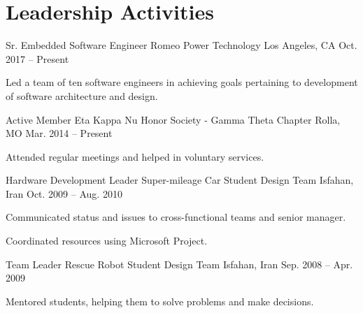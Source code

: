 \section{Leadership Activities}
\begin{cventries}
  \cventry
    {Sr. Embedded Software Engineer}
    {Romeo Power Technology}
    {Los Angeles, CA}
    {Oct. 2017 -- Present}
    {
      \begin{cvitems}
        \item Led a team of ten software engineers in achieving goals pertaining to development of software architecture and design.
      \end{cvitems}
    }
  \cventry
    {Active Member}
    {Eta Kappa Nu Honor Society - Gamma Theta Chapter}
    {Rolla, MO}
    {Mar. 2014 -- Present}
    {
      \begin{cvitems}
        \item Attended regular meetings and helped in voluntary services.
      \end{cvitems}
    }
  \cventry
    {Hardware Development Leader}
    {Super-mileage Car Student Design Team}
    {Isfahan, Iran}
    {Oct. 2009 -- Aug. 2010}
    {
      \begin{cvitems}
        \item Communicated status and issues to cross-functional teams and senior manager.
        \item Coordinated resources using Microsoft Project.
      \end{cvitems}
    }
  \cventry
    {Team Leader}
    {Rescue Robot Student Design Team}
    {Isfahan, Iran}
    {Sep. 2008 -- Apr. 2009}
    {
      \begin{cvitems}
        \item Mentored students, helping them to solve problems and make decisions.
      \end{cvitems}
    }
\end{cventries} 